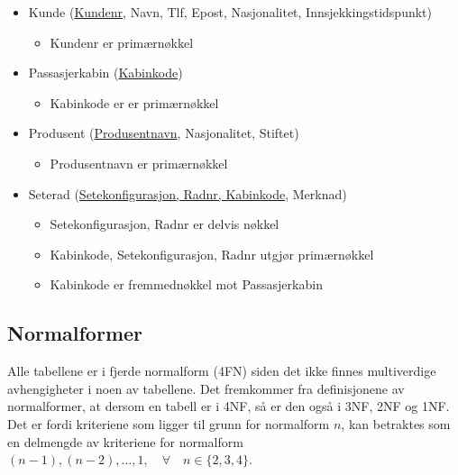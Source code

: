 \documentclass[a4paper,11pt, norsk]{article}
\begin{document}
\begin{itemize}[noitemsep,topsep=0pt,parsep=0pt,partopsep=0pt]
\item Kunde (\underline{Kundenr}, Navn, Tlf, Epost, Nasjonalitet, \mbox{Innsjekkingstidspunkt})
\begin{itemize}
\item Kundenr er primærnøkkel
\end{itemize}

\item Passasjerkabin (\underline{Kabinkode})
\begin{itemize}
\item Kabinkode er er primærnøkkel
\end{itemize}

\item Produsent (\underline{Produsentnavn}, Nasjonalitet, Stiftet)
\begin{itemize}
\item Produsentnavn er primærnøkkel
\end{itemize}

\item Seterad (\underline{Setekonfigurasjon, Radnr, Kabinkode}, Merknad)
\begin{itemize}
\item Setekonfigurasjon, Radnr er delvis nøkkel
\item Kabinkode, Setekonfigurasjon, Radnr utgjør primærnøkkel
\item Kabinkode er fremmednøkkel mot Passasjerkabin 
\end{itemize}

\end{itemize}

\subsection{Normalformer}
Alle tabellene er i fjerde normalform (4FN) siden det ikke finnes
multiverdige avhengigheter i noen av tabellene. Det fremkommer fra definisjonene av normalformer, at dersom en tabell er i 4NF, så er den også i 3NF, 2NF og 1NF. Det er fordi kriteriene som ligger til grunn for normalform $n$, kan betraktes som en delmengde av kriteriene for normalform $(n-1), (n-2), \ldots, 1, \quad \forall \quad n \in \{2,3,4\}$.
\end{document}
